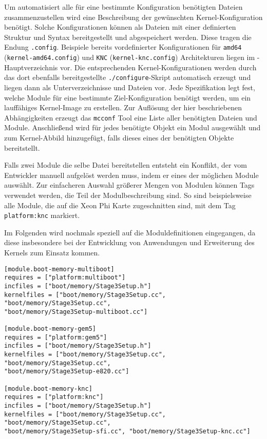 Um automatisiert alle für eine bestimmte Konfiguration benötigten Dateien
zusammenzustellen wird eine Beschreibung der gewünschten Kernel-Konfiguration
benötigt. Solche Konfigurationen können als Dateien mit einer definierten
Struktur und Syntax bereitgestellt und abgespeichert werden. Diese tragen die
Endung \texttt{.config}. Beispiele bereits vordefinierter Konfigurationen für
\texttt{amd64} (\texttt{kernel-amd64.config}) und \texttt{KNC}
(\texttt{kernel-knc.config}) Architekturen liegen im \mythos-Hauptverzeichnis
vor. Die entsprechenden Kernel-Konfigurationen werden durch das dort ebenfalls
bereitgestellte \texttt{./configure}-Skript automatisch erzeugt und liegen dann
als Unterverzeichnisse und Dateien vor. Jede Spezifikation legt fest,
welche Module für eine bestimmte Ziel-Konfiguration benötigt werden, um ein
lauffähiges Kernel-Image zu erstellen. Zur Auflösung der hier
beschriebenen Abhängigkeiten erzeugt das \texttt{mcconf} Tool eine Liste aller
benötigten Dateien und Module. Anschließend wird für jedes benötigte Objekt ein
Modul ausgewählt und zum Kernel-Abbild hinzugefügt, falls dieses eines der
benötigten Objekte bereitstellt. 

Falls zwei Module die selbe Datei bereitstellen entsteht ein Konflikt, der vom
Entwickler manuell aufgelöst werden muss, indem er eines der möglichen Module
auswählt. Zur einfacheren Auswahl größerer Mengen von Modulen können Tags
verwendet werden, die Teil der Modulbeschreibung sind. So sind beispielsweise
alle Module, die auf die Xeon Phi Karte zugeschnitten sind, mit dem Tag
\texttt{platform:knc} markiert.

Im Folgenden wird nochmals speziell auf die Moduldefinitionen eingegangen, da
diese insbesondere bei der Entwicklung von Anwendungen und Erweiterung des
Kernels zum Einsatz kommen.

\begin{lstlisting}[float, label=lst:module, caption=Ein Beispiel einer 
Modulbeschreibung (\texttt{mcconf.module}).]
[module.boot-memory-multiboot]
requires = ["platform:multiboot"]
incfiles = ["boot/memory/Stage3Setup.h"]
kernelfiles = ["boot/memory/Stage3Setup.cc", "boot/memory/Stage3Setup.cc", 
"boot/memory/Stage3Setup-multiboot.cc"]

[module.boot-memory-gem5]
requires = ["platform:gem5"]
incfiles = ["boot/memory/Stage3Setup.h"]
kernelfiles = ["boot/memory/Stage3Setup.cc", "boot/memory/Stage3Setup.cc", 
"boot/memory/Stage3Setup-e820.cc"]

[module.boot-memory-knc]
requires = ["platform:knc"]
incfiles = ["boot/memory/Stage3Setup.h"]
kernelfiles = ["boot/memory/Stage3Setup.cc", "boot/memory/Stage3Setup.cc", 
"boot/memory/Stage3Setup-sfi.cc", "boot/memory/Stage3Setup-knc.cc"]
\end{lstlisting}

